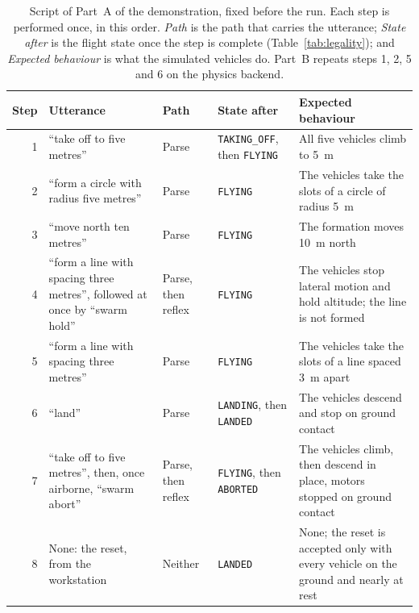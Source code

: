 \begin{table}[htbp]
\centering
\footnotesize
\caption[Script of the demonstration]{Script of Part~A of the demonstration, fixed before the run.
Each step is performed once, in this order. \emph{Path} is the path that carries the utterance;
\emph{State after} is the flight state once the step is complete (Table~\ref{tab:legality}); and
\emph{Expected behaviour} is what the simulated vehicles do. Part~B repeats steps 1, 2, 5 and 6 on
the physics backend.}
\label{tab:demo-script}
\begin{tabularx}{\textwidth}{@{}r >{\raggedright\arraybackslash}p{4.2cm} >{\raggedright\arraybackslash}p{1.7cm} >{\raggedright\arraybackslash}p{2.4cm} X@{}}
\toprule
Step & Utterance & Path & State after & Expected behaviour \\
\midrule
1 & ``take off to five metres'' & Parse & \texttt{TAKING\_OFF}, then \texttt{FLYING} & All five vehicles climb to 5~m \\
2 & ``form a circle with radius five metres'' & Parse & \texttt{FLYING} & The vehicles take the slots of a circle of radius 5~m \\
3 & ``move north ten metres'' & Parse & \texttt{FLYING} & The formation moves 10~m north \\
4 & ``form a line with spacing three metres'', followed at once by ``swarm hold'' & Parse, then reflex & \texttt{FLYING} & The vehicles stop lateral motion and hold altitude; the line is not formed \\
5 & ``form a line with spacing three metres'' & Parse & \texttt{FLYING} & The vehicles take the slots of a line spaced 3~m apart \\
6 & ``land'' & Parse & \texttt{LANDING}, then \texttt{LANDED} & The vehicles descend and stop on ground contact \\
7 & ``take off to five metres'', then, once airborne, ``swarm abort'' & Parse, then reflex & \texttt{FLYING}, then \texttt{ABORTED} & The vehicles climb, then descend in place, motors stopped on ground contact \\
8 & None: the reset, from the workstation & Neither & \texttt{LANDED} & None; the reset is accepted only with every vehicle on the ground and nearly at rest \\
\bottomrule
\end{tabularx}
\end{table}

